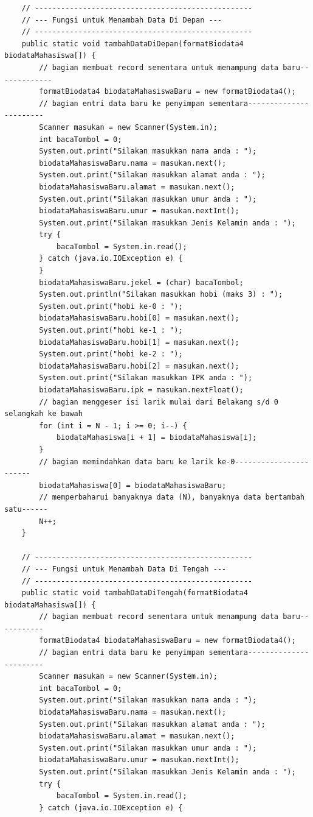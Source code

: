 \documentclass[a4paper,12pt]{article}
\begin{document}
\begin{lstlisting}
    // --------------------------------------------------
    // --- Fungsi untuk Menambah Data Di Depan ---
    // --------------------------------------------------
    public static void tambahDataDiDepan(formatBiodata4 biodataMahasiswa[]) {
        // bagian membuat record sementara untuk menampung data baru-------------
        formatBiodata4 biodataMahasiswaBaru = new formatBiodata4();
        // bagian entri data baru ke penyimpan sementara-----------------------
        Scanner masukan = new Scanner(System.in);
        int bacaTombol = 0;
        System.out.print("Silakan masukkan nama anda : ");
        biodataMahasiswaBaru.nama = masukan.next();
        System.out.print("Silakan masukkan alamat anda : ");
        biodataMahasiswaBaru.alamat = masukan.next();
        System.out.print("Silakan masukkan umur anda : ");
        biodataMahasiswaBaru.umur = masukan.nextInt();
        System.out.print("Silakan masukkan Jenis Kelamin anda : ");
        try {
            bacaTombol = System.in.read();
        } catch (java.io.IOException e) {
        }
        biodataMahasiswaBaru.jekel = (char) bacaTombol;
        System.out.println("Silakan masukkan hobi (maks 3) : ");
        System.out.print("hobi ke-0 : ");
        biodataMahasiswaBaru.hobi[0] = masukan.next();
        System.out.print("hobi ke-1 : ");
        biodataMahasiswaBaru.hobi[1] = masukan.next();
        System.out.print("hobi ke-2 : ");
        biodataMahasiswaBaru.hobi[2] = masukan.next();
        System.out.print("Silakan masukkan IPK anda : ");
        biodataMahasiswaBaru.ipk = masukan.nextFloat();
        // bagian menggeser isi larik mulai dari Belakang s/d 0 selangkah ke bawah
        for (int i = N - 1; i >= 0; i--) {
            biodataMahasiswa[i + 1] = biodataMahasiswa[i];
        }
        // bagian memindahkan data baru ke larik ke-0-----------------------
        biodataMahasiswa[0] = biodataMahasiswaBaru;
        // memperbaharui banyaknya data (N), banyaknya data bertambah satu------
        N++;
    }

    // --------------------------------------------------
    // --- Fungsi untuk Menambah Data Di Tengah ---
    // --------------------------------------------------
    public static void tambahDataDiTengah(formatBiodata4 biodataMahasiswa[]) {
        // bagian membuat record sementara untuk menampung data baru-----------
        formatBiodata4 biodataMahasiswaBaru = new formatBiodata4();
        // bagian entri data baru ke penyimpan sementara-----------------------
        Scanner masukan = new Scanner(System.in);
        int bacaTombol = 0;
        System.out.print("Silakan masukkan nama anda : ");
        biodataMahasiswaBaru.nama = masukan.next();
        System.out.print("Silakan masukkan alamat anda : ");
        biodataMahasiswaBaru.alamat = masukan.next();
        System.out.print("Silakan masukkan umur anda : ");
        biodataMahasiswaBaru.umur = masukan.nextInt();
        System.out.print("Silakan masukkan Jenis Kelamin anda : ");
        try {
            bacaTombol = System.in.read();
        } catch (java.io.IOException e) {


\end{lstlisting}
\end{document}
